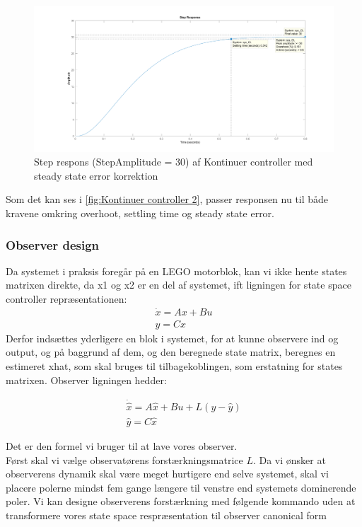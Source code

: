 \begin{figure}[H]
	\centering
	\includegraphics[width = 1\textwidth]{figur/Step_continues_2}
	\caption{Step respons (StepAmplitude = 30) af Kontinuer controller med steady state error korrektion}
	\label{fig:Kontinuer controller 2}
\end{figure}

Som det kan ses i \autoref{fig:Kontinuer controller 2}, passer responsen nu til både kravene omkring overhoot, settling time og steady state error.




\subsubsection{Observer design}
\label{sec:Observer design}
Da systemet i praksis foregår på en LEGO motorblok, kan vi ikke hente states matrixen direkte, da x1 og x2 er en del  af systemet, ift ligningen for state space controller repræsentationen: 
\begin{gather}
\dot{x}=Ax+Bu \\
y=Cx
\end{gather}
Derfor indsættes yderligere en blok i systemet, for at kunne observere ind og output, og på baggrund af dem, og den beregnede state matrix, beregnes en estimeret xhat, som skal bruges til tilbagekoblingen, som erstatning for states matrixen. Observer ligningen\cite{nise2011control} hedder:


\begin{gather}
\dot{\hat{x}}=A\hat{x}+Bu+L(y-\hat{y}) \\
\hat{y}=C\hat{x}
\end{gather}


Det er den formel vi bruger til at lave vores observer.\\

Først skal vi vælge observatørens forstærkningsmatrice $ L $. Da vi ønsker at observerens dynamik skal være meget hurtigere end selve systemet, skal vi placere polerne mindst fem gange længere til venstre end systemets dominerende poler. Vi kan designe observerens forstærkning med følgende kommando uden at transformere vores state space respræsentation til observer canonical form

